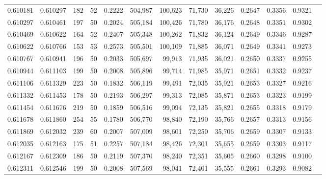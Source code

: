 \begin{tabular}{rrrrrrrrrrrrr}
0.610181 & 0.610297 &   182 &  52 &                                     0.2222 & 504,987 & 100,623 &  71,730 &  36,226 & 0.2647 & 0.3356 & 0.9321 \\
0.610297 & 0.610461 &   197 &  50 &                                     0.2024 & 505,184 & 100,426 &  71,780 &  36,176 & 0.2648 & 0.3351 & 0.9302 \\
0.610469 & 0.610622 &   164 &  52 &                                     0.2407 & 505,348 & 100,262 &  71,832 &  36,124 & 0.2649 & 0.3346 & 0.9287 \\
0.610622 & 0.610766 &   153 &  53 &                                     0.2573 & 505,501 & 100,109 &  71,885 &  36,071 & 0.2649 & 0.3341 & 0.9273 \\
0.610767 & 0.610941 &   196 &  50 &                                     0.2033 & 505,697 &  99,913 &  71,935 &  36,021 & 0.2650 & 0.3337 & 0.9255 \\
0.610944 & 0.611103 &   199 &  50 &                                     0.2008 & 505,896 &  99,714 &  71,985 &  35,971 & 0.2651 & 0.3332 & 0.9237 \\
0.611106 & 0.611329 &   223 &  50 &                                     0.1832 & 506,119 &  99,491 &  72,035 &  35,921 & 0.2653 & 0.3327 & 0.9216 \\
0.611332 & 0.611453 &   178 &  50 &                                     0.2193 & 506,297 &  99,313 &  72,085 &  35,871 & 0.2653 & 0.3323 & 0.9199 \\
0.611454 & 0.611676 &   219 &  50 &                                     0.1859 & 506,516 &  99,094 &  72,135 &  35,821 & 0.2655 & 0.3318 & 0.9179 \\
0.611678 & 0.611860 &   254 &  55 &                                     0.1780 & 506,770 &  98,840 &  72,190 &  35,766 & 0.2657 & 0.3313 & 0.9156 \\
0.611869 & 0.612032 &   239 &  60 &                                     0.2007 & 507,009 &  98,601 &  72,250 &  35,706 & 0.2659 & 0.3307 & 0.9133 \\
0.612035 & 0.612163 &   175 &  51 &                                     0.2257 & 507,184 &  98,426 &  72,301 &  35,655 & 0.2659 & 0.3303 & 0.9117 \\
0.612167 & 0.612309 &   186 &  50 &                                     0.2119 & 507,370 &  98,240 &  72,351 &  35,605 & 0.2660 & 0.3298 & 0.9100 \\
0.612311 & 0.612546 &   199 &  50 &                                     0.2008 & 507,569 &  98,041 &  72,401 &  35,555 & 0.2661 & 0.3293 & 0.9082 \\

\end{tabular}

